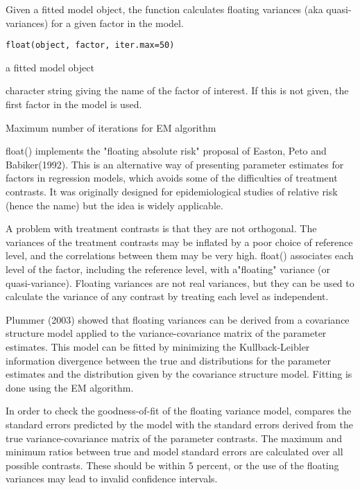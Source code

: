 \begin{Description}\relax
Given a fitted  model object, the  function calculates
floating variances (aka quasi-variances) for a given factor in the model.
\end{Description}
\begin{Usage}
\begin{verbatim}
float(object, factor, iter.max=50)
\end{verbatim}
\end{Usage}
\begin{Arguments}
\begin{ldescription}
\item[\code{object}] a fitted model object
\item[\code{factor}] character string giving the name of the factor of
interest. If this is not given, the first factor in the model is used.
\item[\code{iter.max}] Maximum number of iterations for EM algorithm
\end{ldescription}
\end{Arguments}
\begin{Details}\relax
float() implements the "floating absolute risk" proposal of Easton,
Peto and Babiker(1992). This is an alternative way of presenting
parameter estimates for factors in regression models, which avoids
some of the difficulties of treatment contrasts. It was originally
designed for epidemiological studies of relative risk (hence the name)
but the idea is widely applicable.  

A problem with treatment contrasts is that they are not
orthogonal. The variances of the treatment contrasts may be inflated by
a poor choice of reference level, and the correlations between them
may be very high.  float() associates each level of the factor,
including the reference level, with a"floating" variance (or
quasi-variance). Floating variances are not real variances, but
they can be used to calculate the variance of any contrast by treating
each level as independent.

Plummer (2003) showed that floating variances can be derived from a
covariance structure model applied to the variance-covariance
matrix of the parameter estimates. This model can be fitted by
minimizing the Kullback-Leibler information divergence between the
true and distributions for the parameter estimates and the
distribution given by the covariance structure model. Fitting is
done using the EM algorithm.

In order to check the goodness-of-fit of the floating variance
model,  compares the standard errors predicted
by the model with the standard errors derived from the true
variance-covariance matrix of the parameter contrasts. The maximum
and minimum ratios between true and model standard errors are
calculated over all possible contrasts. These should be within 5
percent, or the use of the floating variances may lead to invalid
confidence intervals.
\end{Details}
